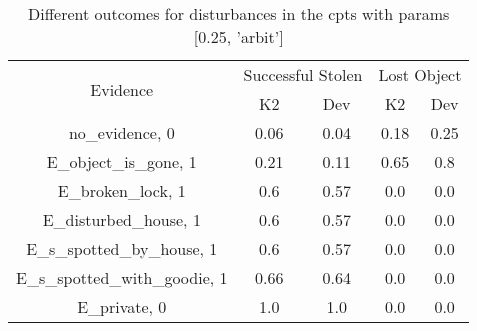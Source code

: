 \begin{table}\begin{tabular}{c|cc|cc}\toprule\multirow{2}{*}{Evidence} & \multicolumn{2}{c}{Successful Stolen} & \multicolumn{2}{c}{Lost Object} \\& {K2} & {Dev} & {K2} & {Dev} \\\midrule
no\_evidence, 0 & \cellcolor{Bittersweet}0.06&\cellcolor{Bittersweet}0.04&\cellcolor{Bittersweet}0.18&\cellcolor{Bittersweet}0.25\\E\_object\_is\_gone, 1 & \cellcolor{Bittersweet}0.21&\cellcolor{Bittersweet}0.11&\cellcolor{Bittersweet}0.65&\cellcolor{Bittersweet}0.8\\E\_broken\_lock, 1 & \cellcolor{Bittersweet}0.6&\cellcolor{Bittersweet}0.57&0.0&0.0\\E\_disturbed\_house, 1 & \cellcolor{Bittersweet}0.6&\cellcolor{Bittersweet}0.57&0.0&0.0\\E\_s\_spotted\_by\_house, 1 & \cellcolor{Bittersweet}0.6&\cellcolor{Bittersweet}0.57&0.0&0.0\\E\_s\_spotted\_with\_goodie, 1 & \cellcolor{Bittersweet}0.66&\cellcolor{Bittersweet}0.64&0.0&0.0\\E\_private, 0 & 1.0&1.0&0.0&0.0\\\bottomrule\end{tabular}\caption{Different outcomes for disturbances in the cpts with params [0.25, 'arbit']}\end{table}